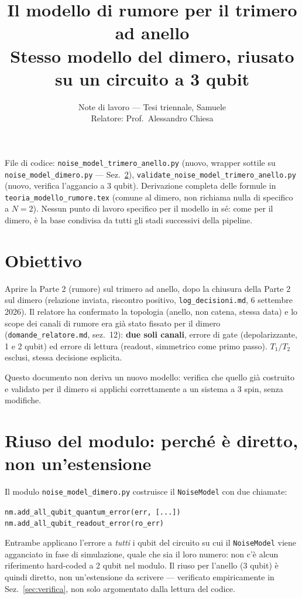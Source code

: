 \documentclass[11pt,a4paper]{article}
\title{\vspace{-1.5em}\color{inkblue}Il modello di rumore per il trimero ad anello\\[0.2em]
\Large\normalfont\color{softgray}Stesso modello del dimero, riusato su un circuito a 3 qubit}
\author{Note di lavoro --- Tesi triennale, Samuele\\ Relatore: Prof.\ Alessandro Chiesa}
\date{}
\begin{document}
\sloppy
\maketitle
\thispagestyle{fancy}
\vspace{-2.0em}

File di codice: \texttt{noise\_model\_trimero\_anello.py} (nuovo, wrapper
sottile su \texttt{noise\_model\_dimero.py} --- Sez.~\ref{sec:riuso}),
\texttt{validate\_noise\_model\_trimero\_anello.py} (nuovo, verifica
l'aggancio a 3 qubit). Derivazione
completa delle formule in \texttt{teoria\_modello\_rumore.tex} (comune al
dimero, non richiama nulla di specifico a $N=2$). Nessun punto di lavoro
specifico per il modello in sé: come per il dimero, è la base condivisa
da tutti gli stadi successivi della pipeline.

\tableofcontents

\section{Obiettivo}

Aprire la Parte 2 (rumore) sul trimero ad anello, dopo la chiusura della
Parte 2 sul dimero (relazione inviata, riscontro positivo,
\texttt{log\_decisioni.md}, 6 settembre 2026). Il relatore ha confermato
la topologia (anello, non catena, stessa data) e lo scope dei canali di
rumore era già stato fissato per il dimero
(\texttt{domande\_relatore.md}, sez.~12): \textbf{due soli canali},
errore di gate (depolarizzante, 1 e 2 qubit) ed errore di lettura
(readout, simmetrico come primo passo). $T_1/T_2$ esclusi, stessa
decisione esplicita.

Questo documento non deriva un nuovo modello: verifica che quello già
costruito e validato per il dimero si applichi correttamente a un
sistema a 3 spin, senza modifiche.

\section{Riuso del modulo: perché è diretto, non un'estensione}
\label{sec:riuso}

Il modulo \texttt{noise\_model\_dimero.py} costruisce il
\texttt{NoiseModel} con due chiamate:
\begin{keyeq}
\centering
\texttt{nm.add\_all\_qubit\_quantum\_error(err, [...])} \qquad
\texttt{nm.add\_all\_qubit\_readout\_error(ro\_err)}
\end{keyeq}
Entrambe applicano l'errore a \emph{tutti} i qubit del circuito su cui
il \texttt{NoiseModel} viene agganciato in fase di simulazione, quale
che sia il loro numero: non c'è alcun riferimento hard-coded a 2 qubit
nel modulo. Il riuso per l'anello (3 qubit) è quindi diretto, non
un'estensione da scrivere --- verificato empiricamente in
Sez.~\ref{sec:verifica}, non solo argomentato dalla lettura del codice.
\end{document}
